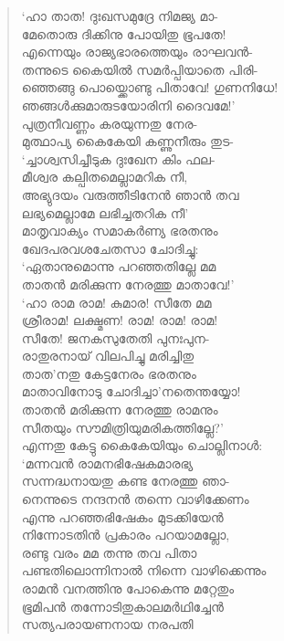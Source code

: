 \begin{verse}
‘ഹാ താത! ദുഃഖസമുദ്രേ നിമജ്യ മാ-\\
മേതൊരു ദിക്കിനു പോയിതു ഭൂപതേ!\\
എന്നെയും രാജ്യഭാരത്തെയും രാഘവന്‍-\\
തന്നുടെ കൈയില്‍ സമര്‍പ്പിയാതെ പിരി-\\
ഞ്ഞെങ്ങു പൊയ്ക്കൊണ്ടു പിതാവേ! ഗുണനിധേ!\\
ഞങ്ങള്‍ക്കുമാരുടയോരിനി ദൈവമേ!’\\
പുത്രനീവണ്ണം കരയുന്നതു നേര-\\
മുത്ഥാപ്യ കൈകേയി കണ്ണുനീരും തുട-\\
‘ച്ചാശ്വസിച്ചീടുക ദുഃഖേന കിം ഫല-\\
മീശ്വര കല്പിതമെല്ലാമറിക നീ,\\
അഭ്യുദയം വരുത്തീടിനേന്‍ ഞാന്‍ തവ\\
ലഭ്യമെല്ലാമേ ലഭിച്ചതറിക നീ’\\
മാതൃവാക്യം സമാകര്‍ണ്യ ഭരതനും\\
ഖേദപരവശചേതസാ ചോദിച്ചു:\\
‘ഏതാനുമൊന്നു പറഞ്ഞതില്ലേ മമ\\
താതന്‍ മരിക്കുന്ന നേരത്തു മാതാവേ!’\\
‘ഹാ രാമ രാമ! കുമാര! സീതേ മമ\\
ശ്രീരാമ! ലക്ഷ്മണ! രാമ! രാമ! രാമ!\\
സീതേ! ജനകസുതേതി പുനഃപുന-\\
രാതുരനായ് വിലപിച്ചു മരിച്ചിതു\\
താത’നതു കേട്ടനേരം ഭരതനും\\
മാതാവിനോടു ചോദിച്ചാ’നതെന്തയ്യോ!\\
താതന്‍ മരിക്കുന്ന നേരത്തു രാമനും\\
സീതയും സൗമിത്രിയുമരികത്തില്ലേ?’\\
എന്നതു കേട്ടു കൈകേയിയും ചൊല്ലിനാള്‍:\\
‘മന്നവ‍ന്‍ രാമനഭിഷേകമാരഭ്യ\\
സന്നദ്ധനായതു കണ്ട നേരത്തു ഞാ-\\
നെന്നുടെ നന്ദനന്‍ തന്നെ വാഴിക്കേണം\\
എന്നു പറഞ്ഞഭിഷേകം മുടക്കിയേന്‍\\
നിന്നോടതിന്‍ പ്രകാരം പറയാമല്ലോ,\\
രണ്ടു വരം മമ തന്നു തവ പിതാ\\
പണ്ടതിലൊന്നിനാല്‍ നിന്നെ വാഴിക്കെന്നും\\
രാമന്‍ വനത്തിനു പോകെന്നു മറ്റേതും\\
ഭൂമിപന്‍ തന്നോടിതുകാലമര്‍ഥിച്ചേന്‍\\
സത്യപരായണനായ നരപതി\\

\end{verse}
